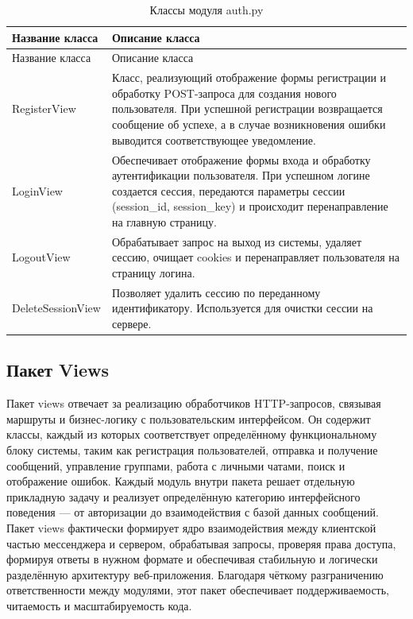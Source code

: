 \begin{xltabular}{\textwidth}{|l|X|}
	\caption{Классы модуля auth.py} \label{tab:auth_classes} \\ \hline
	Название класса & Описание класса \\ \hline
	\endfirsthead
	Название класса & Описание класса \\ \hline
	\finishhead
	RegisterView & Класс, реализующий отображение формы регистрации и обработку POST-запроса для создания нового пользователя. При успешной регистрации возвращается сообщение об успехе, а в случае возникновения ошибки выводится соответствующее уведомление. \\ \hline
	LoginView & Обеспечивает отображение формы входа и обработку аутентификации пользователя. При успешном логине создается сессия, передаются параметры сессии (session\_id, session\_key) и происходит перенаправление на главную страницу. \\ \hline
	LogoutView & Обрабатывает запрос на выход из системы, удаляет сессию, очищает cookies и перенаправляет пользователя на страницу логина. \\ \hline
	DeleteSessionView & Позволяет удалить сессию по переданному идентификатору. Используется для очистки сессии на сервере. \\ \hline
\end{xltabular}

\subsection{Пакет Views}

Пакет views отвечает за реализацию обработчиков HTTP-запросов, связывая маршруты и бизнес-логику с пользовательским интерфейсом. Он содержит классы, каждый из которых соответствует определённому функциональному блоку системы, таким как регистрация пользователей, отправка и получение сообщений, управление группами, работа с личными чатами, поиск и отображение ошибок. Каждый модуль внутри пакета решает отдельную прикладную задачу и реализует определённую категорию интерфейсного поведения — от авторизации до взаимодействия с базой данных сообщений. Пакет views фактически формирует ядро взаимодействия между клиентской частью мессенджера и сервером, обрабатывая запросы, проверяя права доступа, формируя ответы в нужном формате и обеспечивая стабильную и логически разделённую архитектуру веб-приложения. Благодаря чёткому разграничению ответственности между модулями, этот пакет обеспечивает поддерживаемость, читаемость и масштабируемость кода.

